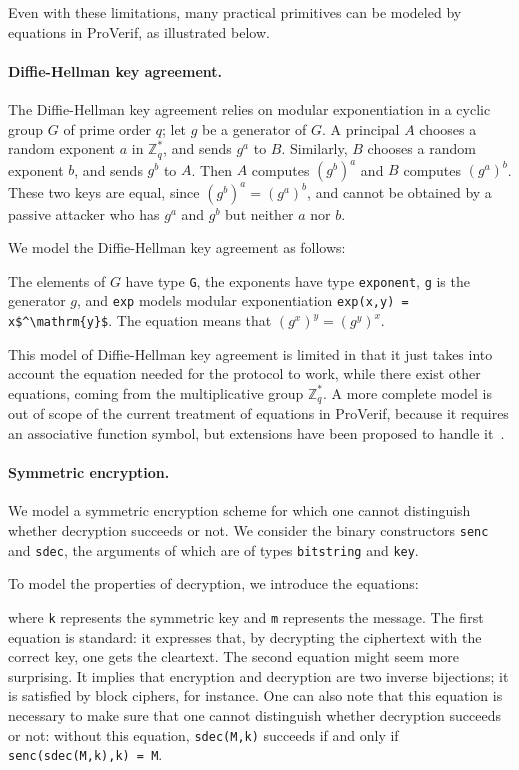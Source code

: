 \documentclass{book}
\begin{document}
Even with these
limitations, many practical primitives can be modeled by equations in
ProVerif, as illustrated below.

\paragraph{Diffie-Hellman key agreement.}
The Diffie-Hellman key agreement relies on modular exponentiation
in a cyclic group $G$ of prime order $q$; let $g$ be a generator
of $G$. A principal $A$ chooses a random exponent $a$ in $\mathbb{Z}_q^*$,
and sends $g^a$ to
$B$. Similarly, $B$ chooses a random exponent $b$, and sends $g^b$ to
$A$. Then $A$ computes $(g^b)^a$ and $B$ computes
$(g^a)^b$. These two keys are equal, since $(g^b)^a = (g^a)^b$, and cannot
be obtained by a passive attacker who has $g^a$ and $g^b$ but neither $a$
nor $b$.

We model the Diffie-Hellman key agreement as follows:

The elements of $G$ have type \lstinline!G!, the exponents have
type \lstinline!exponent!, \lstinline!g! is the generator $g$,
and \lstinline!exp! models modular exponentiation
\lstinline!exp(x,y) = x$^\mathrm{y}$!. The equation means
that $(g^x)^y = (g^y)^x$.

This model of Diffie-Hellman key agreement is limited in that it just takes
into account the equation needed for the protocol to work, while there exist
other equations, coming from the multiplicative group $\mathbb{Z}_q^*$.
A more complete model is out of scope of the current treatment of equations in
ProVerif, because it requires an associative function symbol, but extensions
have been proposed to handle it~\cite{Kuesters09}.

\paragraph{Symmetric encryption.} We model a symmetric encryption scheme for which one cannot distinguish whether decryption succeeds or not. We consider the binary constructors \lstinline{senc} and \lstinline{sdec}, the arguments of which are of types \lstinline{bitstring} and \lstinline{key}.
%

%
To model the properties of decryption, we introduce the equations:
%

%
where \lstinline!k! represents the symmetric key and \lstinline!m! represents the message.
The first equation is standard: it expresses that, by decrypting the
ciphertext with the correct key, one gets the cleartext. The second
equation might seem more surprising. It implies that encryption and
decryption are two inverse bijections; it is satisfied by
block ciphers, for instance. One can also note that this equation is
necessary to make sure that one cannot distinguish whether decryption
succeeds or not: without this equation, \lstinline!sdec(M,k)!
succeeds if and only if \lstinline!senc(sdec(M,k),k) = M!.
\end{document}
